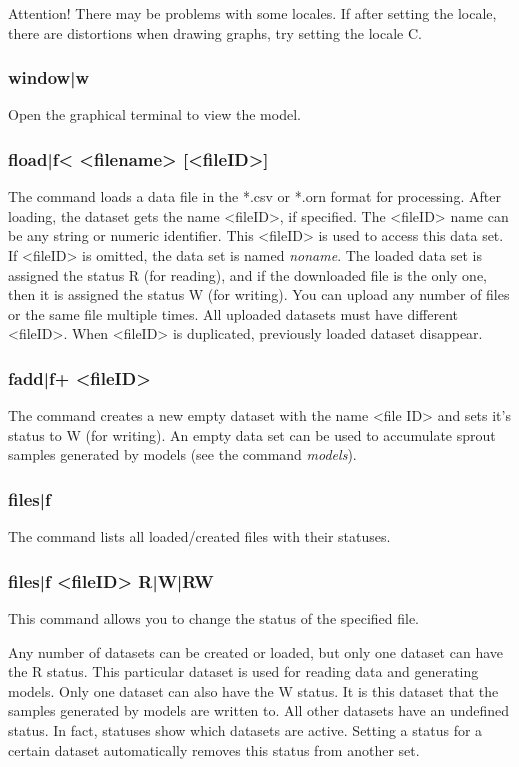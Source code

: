 \documentclass[a4paper]{article}
\begin{document}
Attention! There may be problems with some locales. If after setting the locale, there are distortions when drawing graphs, try setting the locale C.

\subsubsection{window|w}
Open the graphical terminal to view the model.

\subsubsection{fload|f< <filename> [<fileID>]} 
The command loads a data file in the *.csv or *.orn format for processing. After loading, the dataset gets the name <fileID>, if specified. The <fileID> name can be any string or numeric identifier. This <fileID> is used to access this data set. If <fileID> is omitted, the data set is named \textit{noname}. The loaded data set is assigned the status R (for reading), and if the downloaded file is the only one, then it is assigned the status W (for writing). You can upload any number of files or the same file multiple times. All uploaded datasets must have different <fileID>. When <fileID> is duplicated, previously loaded dataset disappear.

\subsubsection{fadd|f+ <fileID>}
The command creates a new empty dataset with the name <file ID> and sets it's status to W (for writing). An empty data set can be used to accumulate sprout samples generated by models (see the command \textit{models}).

\subsubsection{files|f} 
The command lists all loaded/created files with their statuses.

\subsubsection{files|f <fileID> R|W|RW} 
This command allows you to change the status of the specified file.

Any number of datasets can be created or loaded, but only one dataset can have the R status. This particular dataset is used for reading data and generating models. Only one dataset can also have the W status. It is this dataset that the samples generated by models are written to. All other datasets have an undefined status. In fact, statuses show which datasets are active. Setting a status for a certain dataset automatically removes this status from another set. 
\end{document}
